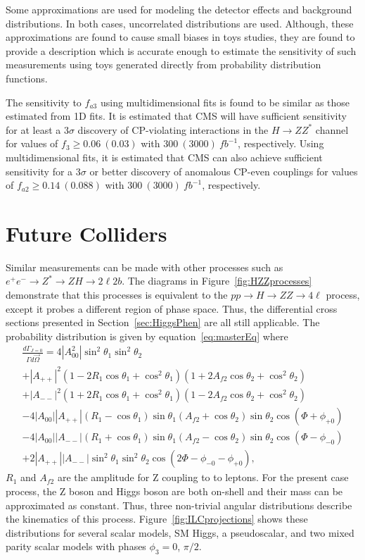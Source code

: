 Some approximations are used for modeling the detector
effects and background distributions.  In both cases,
uncorrelated distributions are used.  Although, these
approximations are found to cause 
small biases in toys studies, they are found to provide 
a description which is accurate enough to estimate the
sensitivity of such measurements using toys generated
directly from probability distribution functions.

The sensitivity to $f_{a3}$ using multidimensional fits
is found to be similar as those estimated from 1D fits.  
It is estimated that CMS will have sufficient sensitivity for
at least a $3\sigma$ discovery of CP-violating interactions in 
the $H\to ZZ^*$ channel for values of $f_{3}\geq0.06~(0.03)$
 with $300~(3000)~fb^{-1}$, respectively.
Using multidimensional fits, it is estimated that CMS can also
achieve sufficient sensitivity 
for a $3\sigma$ or better discovery of anomalous CP-even 
couplings for values of $f_{a2}\geq0.14~(0.088)$ with 
$300~(3000)~fb^{-1}$, respectively.

\section{Future Colliders}

Similar measurements can be made with other processes such as
$e^+e^-\to Z^*\to ZH \to 2\ell2b$.  The diagrams in 
Figure~\ref{fig:HZZprocesses} demonstrate that 
this processes is equivalent to the $pp\to H\to ZZ\to4\ell$
process, except it probes a different region of phase space.
Thus, the differential cross sections
presented in Section~\ref{sec:HiggsPhen} are all still applicable.
The probability distribution is given by equation~\ref{eq:masterEq}
where
\begin{equation}
\begin{split}
\frac{d\Gamma_{J=0}}{\Gamma d\vec{\Omega}} = 4|A_{00}^2|\sin^2\theta_1\sin^2\theta_2 \\
+|A_{++}|^2(1-2R_1\cos\theta_1+\cos^2\theta_1)(1+2A_{f2}\cos\theta_2+\cos^2\theta_2)\\
+|A_{--}|^2(1+2R_1\cos\theta_1+\cos^2\theta_1)(1-2A_{f2}\cos\theta_2+\cos^2\theta_2) \\
-4|A_{00}||A_{++}|(R_1-\cos\theta_1)\sin\theta_1(A_{f2}+\cos\theta_2)\sin\theta_2\cos(\Phi+\phi_{+0}) \\
-4|A_{00}||A_{--}|(R_1+\cos\theta_1)\sin\theta_1(A_{f2}-\cos\theta_2)\sin\theta_2\cos(\Phi-\phi_{-0}) \\
+2|A_{++}||A_{--}|\sin^2\theta_1\sin^2\theta_2\cos(2\Phi-\phi_{-0}-\phi_{+0}),
\end{split}
\end{equation}
$R_1$ and $A_{f2}$ are the amplitude for Z coupling to to 
leptons.
For the present case process, the Z boson and Higgs boson are
both on-shell 
and their mass can be approximated as constant. 
Thus, three non-trivial angular distributions describe 
the kinematics of this process. Figure~\ref{fig:ILCprojections}
shows these distributions for several scalar models, SM Higgs,
a pseudoscalar, and two mixed parity scalar models
with phases $\phi_3=0$, $\pi/2$.  

